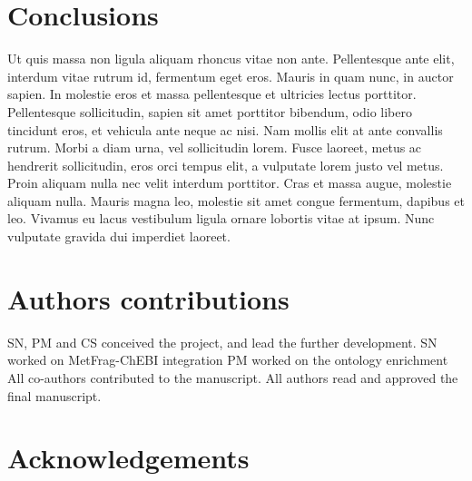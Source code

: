 \documentclass[10pt]{bmc_article}
\newenvironment{bmcformat}{\begin{raggedright}\baselineskip20pt\sloppy\setboolean{publ}{false}}{\end{raggedright}\baselineskip20pt\sloppy}
\begin{document}
\begin{bmcformat}
\section*{Conclusions}
Ut quis massa non ligula aliquam rhoncus vitae non ante. Pellentesque ante elit, interdum vitae rutrum id, fermentum eget eros. Mauris in quam nunc, in auctor sapien. In molestie eros et massa pellentesque et ultricies lectus porttitor. Pellentesque sollicitudin, sapien sit amet porttitor bibendum, odio libero tincidunt eros, et vehicula ante neque ac nisi. Nam mollis elit at ante convallis rutrum. Morbi a diam urna, vel sollicitudin lorem. Fusce laoreet, metus ac hendrerit sollicitudin, eros orci tempus elit, a vulputate lorem justo vel metus. Proin aliquam nulla nec velit interdum porttitor. Cras et massa augue, molestie aliquam nulla. Mauris magna leo, molestie sit amet congue fermentum, dapibus et leo. Vivamus eu lacus vestibulum ligula ornare lobortis vitae at ipsum. Nunc vulputate gravida dui imperdiet laoreet.

    
\section*{Authors contributions}
SN, PM and CS conceived the project, and lead the further development. 
SN worked on MetFrag-ChEBI integration 
PM worked on the ontology enrichment 
All co-authors contributed to the manuscript. 
All authors read and approved the final manuscript.
	    

\section*{Acknowledgements}


 



\end{bmcformat}
\end{document}
